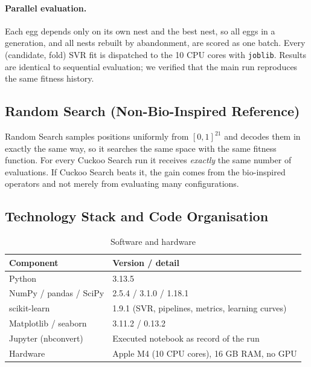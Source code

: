 \documentclass[12pt,a4paper]{article}
\numberwithin{equation}{section}
\numberwithin{table}{section}
\numberwithin{figure}{section}
\begin{document}
\paragraph{Parallel evaluation.} Each egg depends only on its own nest and the best nest, so all eggs in a generation, and all nests rebuilt by abandonment, are scored as one batch. Every (candidate, fold) SVR fit is dispatched to the 10 CPU cores with \texttt{joblib}. Results are identical to sequential evaluation; we verified that the main run reproduces the same fitness history.

\subsection{Random Search (Non-Bio-Inspired Reference)}
Random Search samples positions uniformly from $[0,1]^{21}$ and decodes them in exactly the same way, so it searches the same space with the same fitness function. For every Cuckoo Search run it receives \emph{exactly} the same number of evaluations. If Cuckoo Search beats it, the gain comes from the bio-inspired operators and not merely from evaluating many configurations.

\subsection{Technology Stack and Code Organisation}
\begin{table}[H]
\centering
\caption{Software and hardware}
\label{tab:stack}
\small
\begin{tabular}{@{}ll@{}}
\toprule
\textbf{Component} & \textbf{Version / detail} \\ \midrule
Python & 3.13.5 \\
NumPy / pandas / SciPy & 2.5.4 / 3.1.0 / 1.18.1 \\
scikit-learn & 1.9.1 (SVR, pipelines, metrics, learning curves) \\
Matplotlib / seaborn & 3.11.2 / 0.13.2 \\
Jupyter (nbconvert) & Executed notebook as record of the run \\
Hardware & Apple M4 (10 CPU cores), 16 GB RAM, no GPU \\ \bottomrule
\end{tabular}
\end{table}
\end{document}
